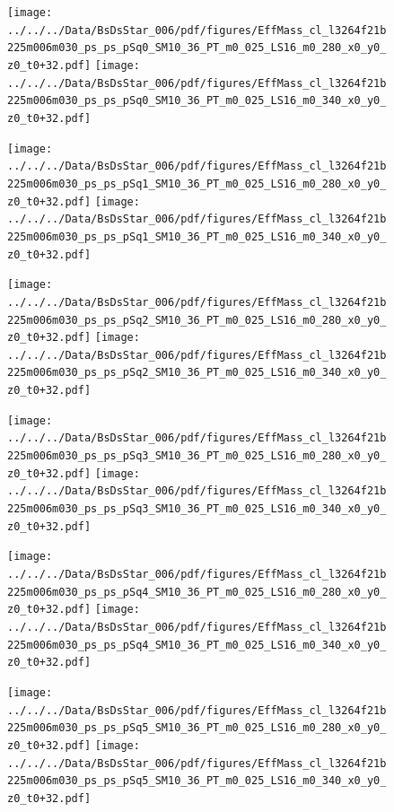 \documentclass[a4paper,10pt]{article}
\begin{document}
\begin{figure}[p]
 \texttt{[image: ../../../Data/BsDsStar\_006/pdf/figures/EffMass\_cl\_l3264f21b225m006m030\_ps\_ps\_pSq0\_SM10\_36\_PT\_m0\_025\_LS16\_m0\_280\_x0\_y0\_z0\_t0+32.pdf]} 
 \texttt{[image: ../../../Data/BsDsStar\_006/pdf/figures/EffMass\_cl\_l3264f21b225m006m030\_ps\_ps\_pSq0\_SM10\_36\_PT\_m0\_025\_LS16\_m0\_340\_x0\_y0\_z0\_t0+32.pdf]} 
 \end{figure}
\begin{figure}[p]
 \texttt{[image: ../../../Data/BsDsStar\_006/pdf/figures/EffMass\_cl\_l3264f21b225m006m030\_ps\_ps\_pSq1\_SM10\_36\_PT\_m0\_025\_LS16\_m0\_280\_x0\_y0\_z0\_t0+32.pdf]} 
 \texttt{[image: ../../../Data/BsDsStar\_006/pdf/figures/EffMass\_cl\_l3264f21b225m006m030\_ps\_ps\_pSq1\_SM10\_36\_PT\_m0\_025\_LS16\_m0\_340\_x0\_y0\_z0\_t0+32.pdf]} 
 \end{figure}
\begin{figure}[p]
 \texttt{[image: ../../../Data/BsDsStar\_006/pdf/figures/EffMass\_cl\_l3264f21b225m006m030\_ps\_ps\_pSq2\_SM10\_36\_PT\_m0\_025\_LS16\_m0\_280\_x0\_y0\_z0\_t0+32.pdf]} 
 \texttt{[image: ../../../Data/BsDsStar\_006/pdf/figures/EffMass\_cl\_l3264f21b225m006m030\_ps\_ps\_pSq2\_SM10\_36\_PT\_m0\_025\_LS16\_m0\_340\_x0\_y0\_z0\_t0+32.pdf]} 
 \end{figure}
\clearpage
\begin{figure}[p]
 \texttt{[image: ../../../Data/BsDsStar\_006/pdf/figures/EffMass\_cl\_l3264f21b225m006m030\_ps\_ps\_pSq3\_SM10\_36\_PT\_m0\_025\_LS16\_m0\_280\_x0\_y0\_z0\_t0+32.pdf]} 
 \texttt{[image: ../../../Data/BsDsStar\_006/pdf/figures/EffMass\_cl\_l3264f21b225m006m030\_ps\_ps\_pSq3\_SM10\_36\_PT\_m0\_025\_LS16\_m0\_340\_x0\_y0\_z0\_t0+32.pdf]} 
 \end{figure}
\begin{figure}[p]
 \texttt{[image: ../../../Data/BsDsStar\_006/pdf/figures/EffMass\_cl\_l3264f21b225m006m030\_ps\_ps\_pSq4\_SM10\_36\_PT\_m0\_025\_LS16\_m0\_280\_x0\_y0\_z0\_t0+32.pdf]} 
 \texttt{[image: ../../../Data/BsDsStar\_006/pdf/figures/EffMass\_cl\_l3264f21b225m006m030\_ps\_ps\_pSq4\_SM10\_36\_PT\_m0\_025\_LS16\_m0\_340\_x0\_y0\_z0\_t0+32.pdf]} 
 \end{figure}
\begin{figure}[p]
 \texttt{[image: ../../../Data/BsDsStar\_006/pdf/figures/EffMass\_cl\_l3264f21b225m006m030\_ps\_ps\_pSq5\_SM10\_36\_PT\_m0\_025\_LS16\_m0\_280\_x0\_y0\_z0\_t0+32.pdf]} 
 \texttt{[image: ../../../Data/BsDsStar\_006/pdf/figures/EffMass\_cl\_l3264f21b225m006m030\_ps\_ps\_pSq5\_SM10\_36\_PT\_m0\_025\_LS16\_m0\_340\_x0\_y0\_z0\_t0+32.pdf]} 
 \end{figure}
\clearpage
\clearpage
\end{document}
